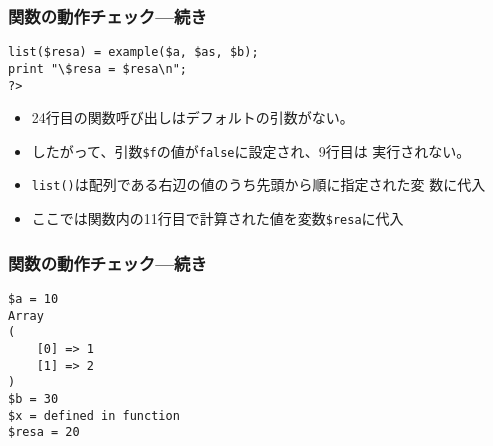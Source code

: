 \begin{frame}[containsverbatim]
\frametitle{関数の動作チェック---続き}
\begin{Verbatim}
list($resa) = example($a, $as, $b);
print "\$resa = $resa\n";
?>
\end{Verbatim}
\begin{itemize}
 \item 24行目の関数呼び出しはデフォルトの引数がない。
 \item したがって、引数\verb+$f+の値が\texttt{false}に設定され、9行目は
       実行されない。
 \item \texttt{list()}は配列である右辺の値のうち先頭から順に指定された変
       数に代入
 \item ここでは関数内の11行目で計算された値を変数\verb+$resa+に代入
\end{itemize}
\end{frame}
\begin{frame}[containsverbatim]
\frametitle{関数の動作チェック---続き}
\begin{Verbatim}
$a = 10
Array
(
    [0] => 1
    [1] => 2
)
$b = 30
$x = defined in function
$resa = 20
\end{Verbatim}
\end{frame}
\iffalse\else
